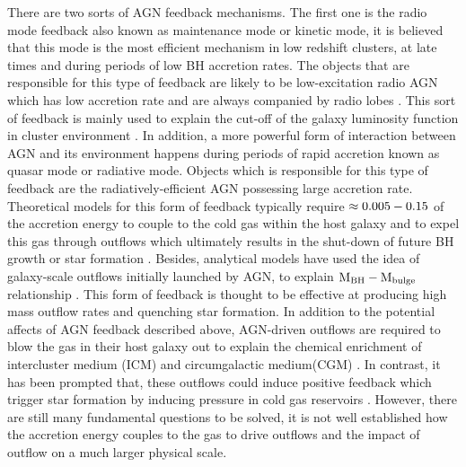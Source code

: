 There are two sorts of AGN feedback mechanisms. The first one is the radio mode feedback also known as maintenance mode or kinetic mode, it is believed that this mode is the most efficient mechanism in low redshift clusters, at late times and during periods of low BH accretion rates. The objects that are responsible for this type of feedback are likely to be low-excitation radio AGN which has low accretion rate and are always companied by radio lobes \citep{churazov2005supermassive,bower2006breaking,mccarthy2011gas}. This sort of feedback is mainly used to explain the cut-off of the galaxy luminosity function in cluster environment \citep{bower2006breaking,croton2006many,somerville2008semi}. In addition, a more powerful form of interaction between AGN and its environment happens during periods of rapid accretion known as quasar mode or radiative mode. Objects which is responsible for this type of feedback are the radiatively-efficient AGN possessing large accretion rate. Theoretical models for this form of feedback typically require $\rm \approx 0.005-0.15$ of the accretion energy to couple to the cold gas within the host galaxy and to expel this gas through outflows which ultimately results in the shut-down of future BH growth or star formation \citep{benson2003shapes,hopkins2006normalization,debuhr2012galaxy}. Besides, analytical models have used the idea of galaxy-scale outflows initially launched by AGN, to explain $\rm M_{BH}-M_{bulge}$ relationship \citep{fabian1999obscured,granato2004physical,king2011large,faucher2012physics}. This form of feedback is thought to be effective at producing high mass outflow rates and quenching star formation. In addition to the potential affects of AGN feedback described above, AGN-driven outflows are required to blow the gas in their host galaxy out to explain the chemical enrichment of intercluster medium (ICM) and circumgalactic medium(CGM) \citep{borgani2008chemical,wiersma2009chemical,fabjan2010simulating,ciotti2010feedback}. In contrast, it has been prompted that, these outflows could induce positive feedback which trigger star formation by inducing pressure in cold gas reservoirs \citep{nayakshin2012quasar,ishibashi2012active,silk2013unleashing}. However, there are still many fundamental questions to be solved, it is not well established how the accretion energy couples to the gas to drive outflows and the impact of outflow on a much larger physical scale. 

